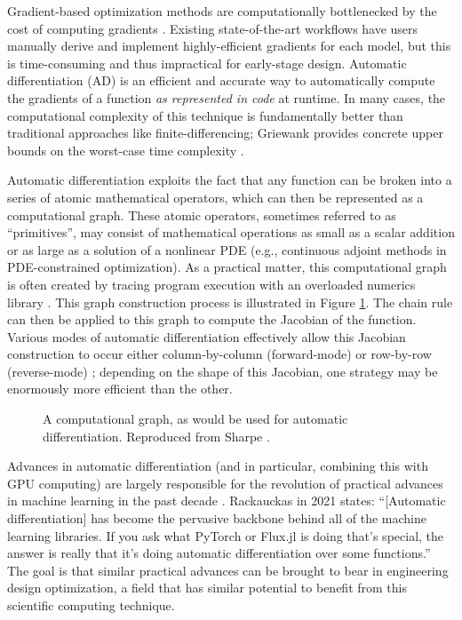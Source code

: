 Gradient-based optimization methods are computationally bottlenecked by the cost of computing gradients \cite{lyu_benchmarking_2014, martins_engineering_2021}. Existing state-of-the-art workflows have users manually derive and implement highly-efficient gradients for each model, but this is time-consuming and thus impractical for early-stage design. Automatic differentiation (AD) is an efficient and accurate way to automatically compute the gradients of a function \textit{as represented in code} at runtime. In many cases, the computational complexity of this technique is fundamentally better than traditional approaches like finite-differencing; Griewank provides concrete upper bounds on the worst-case time complexity \cite{griewank_automatic_1988}.

Automatic differentiation exploits the fact that any function can be broken into a series of atomic mathematical operators, which can then be represented as a computational graph. These atomic operators, sometimes referred to as ``primitives'', may consist of mathematical operations as small as a scalar addition or as large as a solution of a nonlinear PDE (e.g., continuous adjoint methods in PDE-constrained optimization). As a practical matter, this computational graph is often created by tracing program execution with an overloaded numerics library \cite{maclaurin_autograd_2015}. This graph construction process is illustrated in Figure \ref{fig:computational-graph}. The chain rule can then be applied to this graph to compute the Jacobian of the function. Various modes of automatic differentiation effectively allow this Jacobian construction to occur either column-by-column (forward-mode) or row-by-row (reverse-mode) \cite{casadi, jax, martins_engineering_2021}; depending on the shape of this Jacobian, one strategy may be enormously more efficient than the other.

\begin{figure}[H]
    \centering
    \centerline{}
    \caption{A computational graph, as would be used for automatic differentiation. Reproduced from Sharpe \cite{sharpe_aerosandbox_2021}.}
    \label{fig:computational-graph}
\end{figure}

Advances in automatic differentiation (and in particular, combining this with GPU computing) are largely responsible for the revolution of practical advances in machine learning in the past decade \cite{baydin_automatic_2018}. Rackauckas in 2021 \cite{rackauckas_generalizing_2021} states: ``[Automatic differentiation] has become the pervasive backbone behind all of the machine learning libraries. If you ask what PyTorch or Flux.jl is doing that’s special, the answer is really that it’s doing automatic differentiation over some functions.'' The goal is that similar practical advances can be brought to bear in engineering design optimization, a field that has similar potential to benefit from this scientific computing technique.

